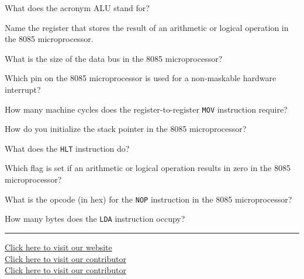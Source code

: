 \documentclass[11pt,a4paper]{article}
\begin{document}
\begin{parts}
  \item What does the acronym ALU stand for?
  \item Name the register that stores the result of an arithmetic or logical operation in the 8085 microprocessor.
  \item What is the size of the data bus in the 8085 microprocessor?
  \item Which pin on the 8085 microprocessor is used for a non-maskable hardware interrupt?
  \item How many machine cycles does the register-to-register   \texttt{MOV} instruction require?
  \item How do you initialize the stack pointer in the 8085 microprocessor?
  \item What does the   \texttt{HLT} instruction do?
  \item Which flag is set if an arithmetic or logical operation results in zero in the 8085 microprocessor?
  \item What is the opcode (in hex) for the   \texttt{NOP} instruction in the 8085 microprocessor?
  \item How many bytes does the   \texttt{LDA} instruction occupy?
\end{parts}

\vfill
\rule{\linewidth}{0.4pt}

\begin{center}\small
\href{https://bhu-exam.vercel.app/}{Click here to visit our website}\\[4pt]\href{https://me-aryan.vercel.app/}{Click here to visit our contributor}\\[4pt]\href{https://quashan-me.vercel.app/}{Click here to visit our contributor}
\end{center}
\end{document}
